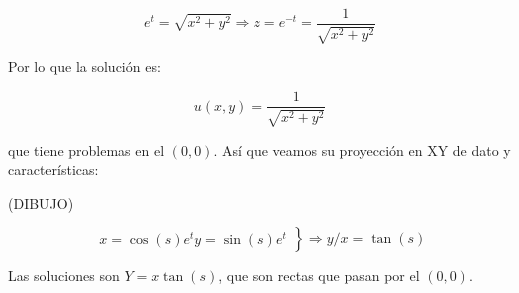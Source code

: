 \begin{example}{5}
		\[e^t = \sqrt{x^2 + y^2} \Rightarrow z = e^{-t} = \frac{1}{\sqrt{x^2 + y^2}} \]

		Por lo que la solución es:

		\[ u(x,y) = \frac{1}{\sqrt{x^2+y^2}}\]

		que tiene problemas en el $(0,0)$. Así que veamos su proyección en XY de dato y características:

		(DIBUJO)

		\[
		\left.\begin{array}{r}
			x = \cos (s) e^t
			y = \sin (s) e^t
		\end{array}\right\} \Rightarrow y/x = \tan(s) \]

		Las soluciones son $Y = x \tan(s)$, que son rectas que pasan por el $(0,0)$.

	\end{example}

